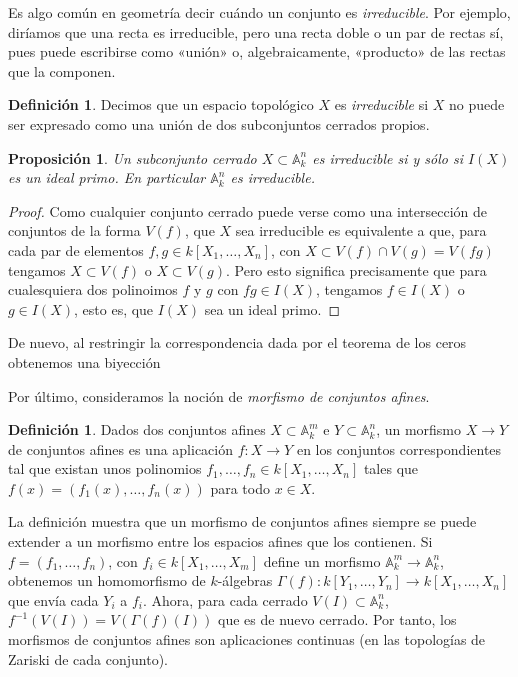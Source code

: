 \documentclass[12pt,a4paper]{article}
\newtheorem{prop}[thm]{Proposición}
\theoremstyle{definition} \newtheorem{defn}[thm]{Definición}
\theoremstyle{definition} \newtheorem{ejemplo}[thm]{Ejemplo}
\theoremstyle{definition} \newtheorem{ejercicio}[thm]{Ejercicio}
\theoremstyle{remark} \newtheorem*{obs}{Observación}
\def\AA{\mathbb{A}}
\begin{document}
  Es algo común en geometría decir cuándo un conjunto es \emph{irreducible}. Por ejemplo, diríamos que una recta es irreducible, pero una recta doble o un par de rectas sí, pues puede escribirse como «unión» o, algebraicamente, «producto» de las rectas que la componen. 
  \begin{defn}
  Decimos que un espacio topológico $X$ es \emph{irreducible} si $X$ no puede ser expresado como una unión de dos subconjuntos cerrados propios. 
\end{defn}
  \begin{prop}
    Un subconjunto cerrado $X\subset \AA_k^n$ es irreducible si y sólo si $I(X)$ es un ideal primo. En particular $\AA_k^n$ es irreducible.
  \end{prop}
  \begin{proof}
    Como cualquier conjunto cerrado puede verse como una intersección de conjuntos de la forma $V(f)$, que $X$ sea irreducible es equivalente a que, para cada par de elementos $f,g\in k[X_1,\dots,X_n]$, con $X\subset V(f)\cap V(g)=V(fg)$ tengamos $X\subset V(f)$ o $X \subset V(g)$. Pero esto significa precisamente que para cualesquiera dos polinoimos $f$ y $g$ con $fg\in I(X)$, tengamos $f\in I(X)$ o $g\in I(X)$, esto es, que $I(X)$ sea un ideal primo.
  \end{proof}
  De nuevo, al restringir la correspondencia dada por el teorema de los ceros obtenemos una biyección
  \begin{center}
  \end{center}

  Por último, consideramos la noción de \emph{morfismo de conjuntos afines}.
  \begin{defn}
    Dados dos conjuntos afines $X\subset \AA^m_k$ e $Y\subset \AA^n_k$, un morfismo $X\rightarrow Y$ de conjuntos afines es una aplicación $f:X\rightarrow Y$ en los conjuntos correspondientes tal que existan unos polinomios $f_1,\dots,f_n\in k[X_1,\dots,X_n]$ tales que $f(x)=(f_1(x),\dots,f_n(x))$ para todo $x\in X$.
\end{defn}

La definición muestra que un morfismo de conjuntos afines siempre se puede extender a un morfismo entre los espacios afines que los contienen. Si $f=(f_1,\dots,f_n)$, con $f_i \in k[X_1,\dots,X_m]$ define un morfismo $\AA^m_k\rightarrow \AA^n_k$, obtenemos un homomorfismo de $k$-álgebras $\Gamma(f):k[Y_1,\dots,Y_n] \rightarrow k[X_1,\dots,X_n]$ que envía cada $Y_i$ a $f_i$. Ahora, para cada cerrado $V(I)\subset \AA^n_k$, $f^{-1}(V(I))=V(\Gamma(f)(I))$ que es de nuevo cerrado. Por tanto, los morfismos de conjuntos afines son aplicaciones continuas (en las topologías de Zariski de cada conjunto).
\end{document}
